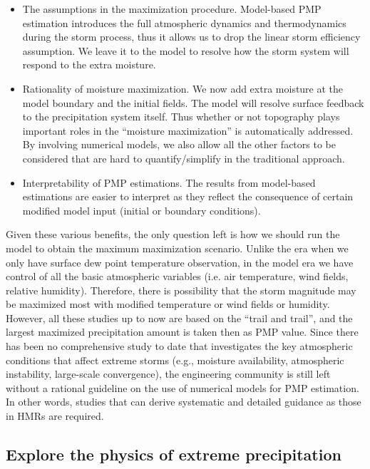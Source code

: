 \begin{itemize}
\item The assumptions in the maximization procedure. Model-based PMP estimation introduces the full atmospheric dynamics and thermodynamics during the storm process, thus it allows us to drop the linear storm efficiency assumption. We leave it to the model to resolve how the storm system will respond to the extra moisture.

\item Rationality of moisture maximization. We now add extra moisture at the model boundary and the initial fields. The model will resolve surface feedback to the precipitation system itself. Thus whether or not topography plays important roles in the ``moisture maximization'' is automatically addressed. By involving numerical models, we also allow all the other factors to be considered that are hard to quantify/simplify in the traditional approach.

\item Interpretability of PMP estimations. The results from model-based estimations are easier to interpret as they reflect the consequence of certain modified model input (initial or boundary conditions).
\end{itemize}

Given these various benefits, the only question left is how we should run the model to obtain the maximum maximization scenario. Unlike the era when we only have surface dew point temperature observation, in the model era we have control of all the basic atmospheric variables (i.e. air temperature, wind fields, relative humidity). Therefore, there is possibility that the storm magnitude may be maximized most with modified temperature or wind fields or humidity. However, all these studies up to now are based on the ``trail and trail'', and the largest maximized precipitation amount is taken then as PMP value. Since there has been no comprehensive study to date that investigates the key atmospheric conditions that affect extreme storms (e.g., moisture availability, atmospheric instability, large-scale convergence), the engineering community is still left without a rational guideline on the use of numerical models for PMP estimation. In other words, studies that can derive systematic and detailed guidance as those in HMRs are required.

\subsection{Explore the physics of extreme precipitation}

